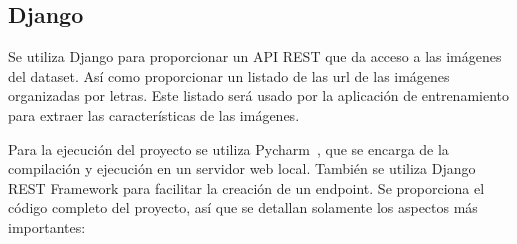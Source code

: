 \documentclass[../main.tex]{subfiles}
\begin{document}
\subsection{Django}

Se utiliza Django para proporcionar un API REST que da acceso a las imágenes del dataset. Así como proporcionar un listado de las url de las imágenes organizadas por letras. Este listado será usado por la aplicación de entrenamiento para extraer las características de las imágenes.

Para la ejecución del proyecto se utiliza Pycharm~\cite{pycharm}, que se encarga de la compilación y ejecución en un servidor web local. También se utiliza Django REST Framework \cite{restframework} para facilitar la creación de un endpoint. Se proporciona el código completo del proyecto, así que se detallan solamente los aspectos más importantes:
\end{document}
